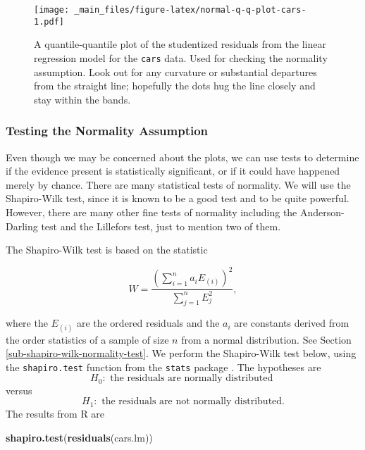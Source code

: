 \documentclass[]{book}
\newenvironment{Shaded}{\begin{snugshade}}{\end{snugshade}}
\newcommand{\KeywordTok}[1]{\textcolor[rgb]{0.13,0.29,0.53}{\textbf{{#1}}}}
\newcommand{\NormalTok}[1]{{#1}}
\numberwithin{equation}{chapter}
\numberwithin{figure}{chapter}
\theoremstyle{plain}
\theoremstyle{definition}
\theoremstyle{remark}
\theoremstyle{definition}
\theoremstyle{definition}
\theoremstyle{remark}
\begin{document}
\begin{figure}[htbp]
\centering
\texttt{[image: \_main\_files/figure-latex/normal-q-q-plot-cars-1.pdf]}
\caption{\label{fig:normal-q-q-plot-cars}\small A quantile-quantile plot of the
studentized residuals from the linear regression model for the
\texttt{cars} data. Used for checking the normality assumption. Look out
for any curvature or substantial departures from the straight line;
hopefully the dots hug the line closely and stay within the bands.}
\end{figure}







\subsubsection{Testing the Normality
Assumption}\label{testing-the-normality-assumption}

Even though we may be concerned about the plots, we can use tests to
determine if the evidence present is statistically significant, or if it
could have happened merely by chance. There are many statistical tests
of normality. We will use the Shapiro-Wilk test, since it is known to be
a good test and to be quite powerful. However, there are many other fine
tests of normality including the Anderson-Darling test and the Lillefors
test, just to mention two of them.

The Shapiro-Wilk test is based on the statistic

\begin{equation}
W=\frac{\left(\sum_{i=1}^{n}a_{i}E_{(i)}\right)^{2}}{\sum_{j=1}^{n}E_{j}^{2}},
\end{equation}

where the \(E_{(i)}\) are the ordered residuals and the \(a_{i}\) are
constants derived from the order statistics of a sample of size \(n\)
from a normal distribution. See Section
\ref{sub-shapiro-wilk-normality-test}. We perform the Shapiro-Wilk test
below, using the \texttt{shapiro.test} function from the \texttt{stats}
package \autocite{stats}. The hypotheses are \[
H_{0}:\mbox{ the residuals are normally distributed } \] versus \[
H_{1}:\mbox{ the residuals are not normally distributed.}  \] The
results from R are

\begin{Shaded}
\begin{Highlighting}[]
\KeywordTok{shapiro.test}\NormalTok{(}\KeywordTok{residuals}\NormalTok{(cars.lm))}
\end{Highlighting}
\end{Shaded}
\end{document}
